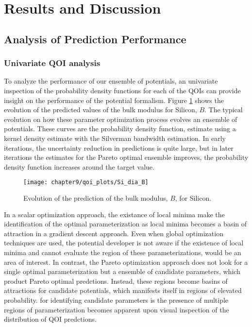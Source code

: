 \section{Results and Discussion}

\subsection{Analysis of Prediction Performance}
\subsubsection{Univariate QOI analysis}
To analyze the performance of our ensemble of potentials, an univariate inspection of the probability density functions for each of the QOIs can provide insight on the performance of the potential formalism.
Figure \ref{fig:Si_qoi_B} shows the evolution of the predicted values of the bulk modulus for Silicon, $B$.  The typical evolution on how these parameter optimization process evolves an ensemble of potentials.
These curves are the probability density function, estimate using a kernel density estimate with the Silverman bandwidth estimation.
In early iterations, the uncertainty reduction in predictions is quite large, but in later iterations the estimates for the Pareto optimal ensemble improves, the probability density function increases around the target value.

\begin{figure}[h]
	\centering
	\texttt{[image: chapter9/qoi\_plots/Si\_dia\_B]}
	\caption{Evolution of the prediction of the bulk modulus, $B$, for Silicon.}
	\label{fig:Si_qoi_B}
\end{figure}

In a scalar optimization approach, the existance of local minima make the identification of the optimal parameterization as local minima becomes a basin of attraction in a gradient descent approach.
Even when global optimization techniques are used, the potential developer is not aware if the existence of local minima and cannot evaluate the region of these parameterizations, would be an area of interest.
In contrast, the Pareto optimization approach does not look for a single optimal parameterization but a ensemble of candidate parameters, which product Pareto optimal predctions.
Instead, these regions become basins of attractions for candidate potentials, which manifests itself in regions of elevated probability.
for identifying candidate parameters is the presence of multiple regions of parameterization becomes apparent upon visual inspection of the distribution of QOI predctions.

